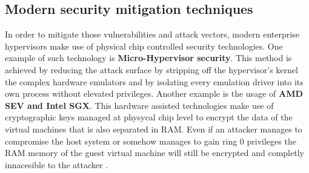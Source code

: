 \subsection{Modern security mitigation techniques}
In order to mitigate those vulnerabilities and attack vectors, modern enterprise hypervisors make use of physical chip controlled security technologies. One example of such technology is \textbf{Micro-Hypervisor security}. This method is achieved by reducing the attack surface by stripping off the hypervisor's kernel the complex hardware emulators and by isolating every emulation driver into its own process without elevated privileges. Another example is the usage of \textbf{AMD SEV and Intel SGX}. This hardware assisted technologies make use of cryptographic keys managed at physycal chip level to encrypt the data of the virtual machines that is also separated in RAM. Even if an attacker manages to compromise the host system or somehow manages to gain ring 0 privileges the RAM memory of the guest virtual machine will still be encrypted and completly innacesible to the attacker \cite{vm-attack-vectors,vm-security.pdf}. 